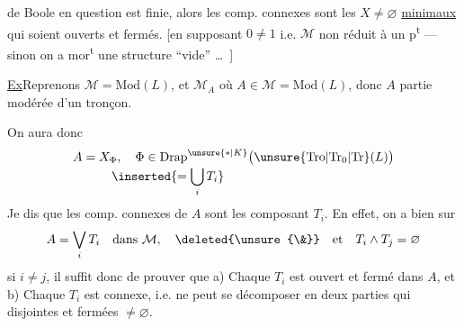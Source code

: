 de Boole en question est finie, alors les comp. connexes sont les  $X\ne\varnothing$ \uline{minimaux} qui soient ouverts et fermés. [en supposant $0\ne1$
i.e. $\mathcal M$ non réduit à un p\textsuperscript{t} --- sinon on a  mor\textsuperscript{t} une structure ``vide'' \ldots\ ]

\uline{Ex}\qquad Reprenons $\mathcal M=\mathrm{Mod}(L)$, et $\mathcal M_A$ où $A\in \mathcal M=\mathrm{Mod}(L)$, donc $A$ partie modérée d'un tronçon.

On aura donc
\[
\begin{aligned}
A=X_{\Phi} &,\quad
\Phi\in{\operatorname{Drap}}^{\unsure{*|K}}
  \bigl(\unsure{\mathrm{Tro}|\mathrm{Tr}_0|\mathrm{Tr}}(L)\bigr)\\[-0.6ex]
 &\mkern-8mu\inserted{=\bigcup_i T_i}
\end{aligned}
\]
Je dis que les comp. connexes de $A$ sont les  composant $T_i$.
En effet, on a bien sur
\[
A=\bigvee_i T_i\quad\text{dans }\mathcal M,\quad\deleted{\unsure{\&}}\quad\text{et}\quad T_i\wedge T_j=\varnothing
\]
si $i\ne j$, il suffit donc de prouver que a) Chaque $T_i$ est ouvert et fermé dans $A$, et b) Chaque $T_i$ est connexe, i.e. ne peut se décomposer en deux parties qui  disjointes et  fermées $\ne\varnothing$.
